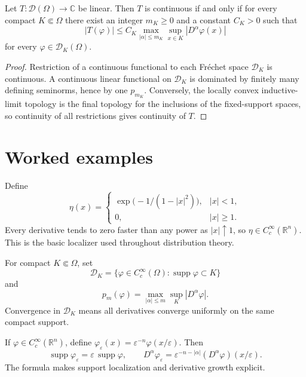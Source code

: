 \begin{theorem}\label{thm:iii15-04}
Let \(T:\mathcal D(\Omega)\to\mathbb C\) be linear. Then \(T\) is continuous
if and only if for every compact \(K\Subset\Omega\) there exist an integer
\(m_K\ge0\) and a constant \(C_K>0\) such that
\[
|T(\varphi)|
\le
C_K
\max_{|\alpha|\le m_K}
\sup_{x\in K}|D^\alpha\varphi(x)|
\]
for every \(\varphi\in\mathcal D_K(\Omega)\).
\begin{proof}
Restriction of a continuous functional to each Fr\'echet space
\(\mathcal D_K\) is continuous. A continuous linear functional on
\(\mathcal D_K\) is dominated by finitely many defining seminorms, hence by one
\(p_{m_K}\). Conversely, the locally convex inductive-limit topology is the
final topology for the inclusions of the fixed-support spaces, so continuity
of all restrictions gives continuity of \(T\).
\end{proof}
\end{theorem}

\section{Worked examples}

\begin{example}\label{ex:iii15-worked-01}
Define
\[
\eta(x)=
\begin{cases}
\exp\!\bigl(-1/(1-|x|^2)\bigr),&|x|<1,\\
0,&|x|\ge1.
\end{cases}
\]
Every derivative tends to zero faster than any power as \(|x|\uparrow1\), so
\(\eta\in C_c^\infty(\mathbb R^n)\). This is the basic localizer used
throughout distribution theory.
\end{example}

\begin{example}\label{ex:iii15-worked-02}
For compact \(K\Subset\Omega\), set
\[
\mathcal D_K=\{\varphi\in C_c^\infty(\Omega):\operatorname{supp}\varphi\subset K\}
\]
and
\[
p_m(\varphi)=\max_{|\alpha|\le m}\sup_K|D^\alpha\varphi|.
\]
Convergence in \(\mathcal D_K\) means all derivatives converge uniformly on the
same compact support.
\end{example}

\begin{example}\label{ex:iii15-worked-03}
If \(\varphi\in C_c^\infty(\mathbb R^n)\), define
\(\varphi_\varepsilon(x)=\varepsilon^{-n}\varphi(x/\varepsilon)\). Then
\[
\operatorname{supp}\varphi_\varepsilon
=\varepsilon\,\operatorname{supp}\varphi,\qquad
D^\alpha\varphi_\varepsilon
=\varepsilon^{-n-|\alpha|}(D^\alpha\varphi)(x/\varepsilon).
\]
The formula makes support localization and derivative growth explicit.
\end{example}

